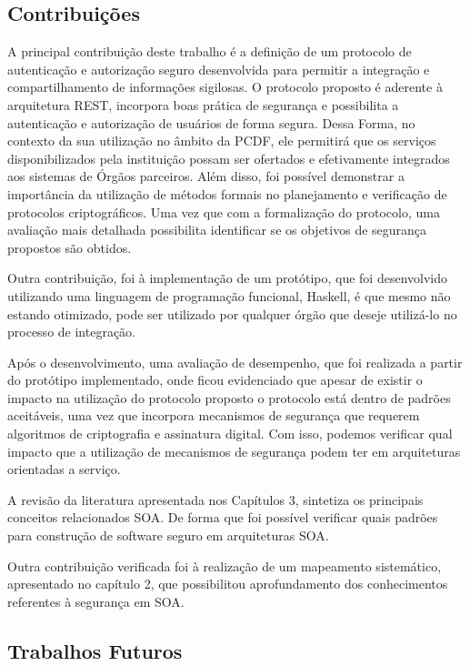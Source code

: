 \subsection{Contribuições}
A principal contribuição deste trabalho é a definição de um protocolo de autenticação e autorização seguro desenvolvida para permitir a integração e compartilhamento de informações sigilosas. O protocolo proposto é aderente à arquitetura REST, incorpora boas prática de segurança e possibilita a autenticação e autorização de usuários de forma segura. Dessa Forma, no contexto da sua utilização no âmbito da PCDF, ele permitirá que os serviços disponibilizados pela instituição possam ser ofertados e efetivamente integrados aos sistemas de Órgãos parceiros. Além disso, foi possível demonstrar a importância da utilização de métodos formais no planejamento e verificação de protocolos criptográficos. Uma vez que com a formalização do protocolo, uma avaliação mais detalhada possibilita identificar se os objetivos de segurança propostos são obtidos.

Outra contribuição, foi à implementação de um protótipo, que foi desenvolvido utilizando uma linguagem de programação funcional, Haskell, é que mesmo não estando otimizado, pode ser utilizado por qualquer órgão que deseje utilizá-lo no processo de integração.

Após o desenvolvimento, uma avaliação de desempenho, que foi realizada a partir do protótipo implementado, onde ficou evidenciado que apesar de existir o impacto na utilização do protocolo proposto o protocolo está dentro de padrões aceitáveis, uma vez que incorpora mecanismos de segurança que requerem algoritmos de criptografia e assinatura digital. Com isso, podemos verificar qual impacto que a utilização de mecanismos de segurança podem ter em arquiteturas orientadas a serviço.

A revisão da literatura apresentada nos Capítulos 3, sintetiza os principais conceitos relacionados SOA. De forma que foi possível verificar quais padrões para construção de software seguro em arquiteturas SOA.

Outra contribuição verificada foi à realização de um mapeamento sistemático, apresentado no capítulo 2, que possibilitou aprofundamento dos conhecimentos referentes à segurança em SOA.


\subsection{Trabalhos Futuros}

